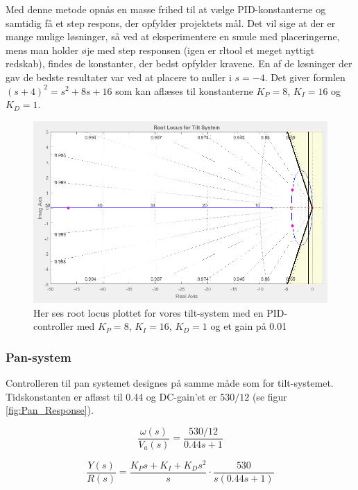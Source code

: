 Med denne metode opnås en masse frihed til at vælge PID-konstanterne og samtidig få et step respons, der opfylder projektets mål. Det vil sige at der er mange mulige løsninger, så ved at eksperimentere en smule med placeringerne, mens man holder øje med step responsen (igen er rltool et meget nyttigt redskab), findes de konstanter, der bedst opfylder kravene. En af de løsninger der gav de bedste resultater var ved at placere to nuller i $s=-4$. Det giver formlen $(s+4)^2=s^2+8s+16$ som kan aflæses til konstanterne $K_{P}=8$, $K_{I}=16$ og $K_{D}=1$. 

\begin{figure}[ht]
	\begin{center}
		\includegraphics[scale=0.45]{Billeder/Tilt_Rlocus.PNG}
	\end{center}
\caption{Her ses root locus plottet for vores tilt-system med en PID-controller med $K_{P}=8$, $K_{I}=16$, $K_{D}=1$ og et gain på 0.01}
\label{fig:Tilt_rlocus}
\end{figure}

\subsubsection{Pan-system}

Controlleren til pan systemet designes på samme måde som for tilt-systemet. Tidskonstanten er aflæst til 0.44 og DC-gain'et er $530/12$ (se figur \ref{fig:Pan_Response}). 

\begin{equation}\label{eq:pan_tf}
\frac{\omega(s)}{V_{a}(s)}=\frac{530/12}{0.44s+1}
\end{equation}

\begin{equation}\label{eq:pan_ol_tf}
\frac{Y(s)}{R(s)}=\frac{K_{P}s+K_{I}+K_{D}s^2}{s}\cdot\frac{530}{s(0.44s+1)}
\end{equation}

